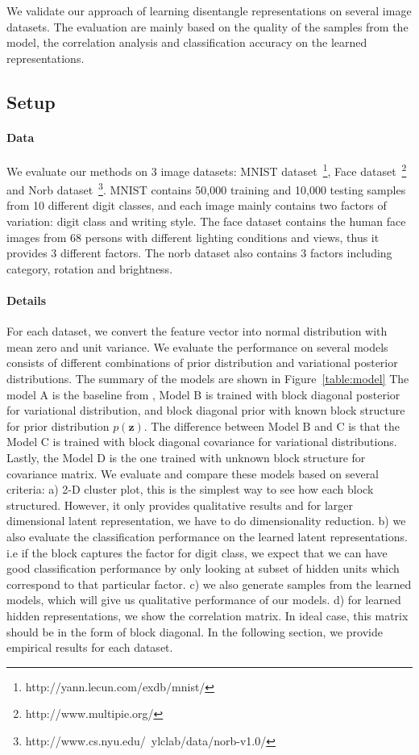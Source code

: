 We validate our approach of learning disentangle representations on several image datasets. The evaluation are mainly based on the quality of the samples from the model, the correlation analysis and classification accuracy on the learned representations. 

\subsection{Setup}
\paragraph{Data} We evaluate our methods on 3 image datasets: MNIST dataset~\footnote{http://yann.lecun.com/exdb/mnist/}, Face dataset~\footnote{http://www.multipie.org/} and Norb dataset~\footnote{http://www.cs.nyu.edu/~ylclab/data/norb-v1.0/}. MNIST contains 50,000 training and 10,000 testing samples from 10 different digit classes, and each image mainly contains two factors of variation: digit class and writing style. The face dataset contains the human face images from 68 persons with different lighting conditions and views, thus it provides 3 different factors. The norb dataset also contains 3 factors including category, rotation and brightness. 

\paragraph{Details} For each dataset, we convert the feature vector into normal distribution with mean zero and unit variance. We evaluate the performance on several models consists of different combinations of prior distribution and variational posterior distributions. The summary of the models are shown in Figure~\ref{table:model} The model A is the baseline from \cite{kingma2013auto}, Model B is trained with block diagonal posterior for variational distribution, and block diagonal prior with known block structure for prior distribution $p(\mathbf{z})$. The difference between Model B and C is that the Model C is trained with block diagonal covariance for variational distributions. Lastly, the Model D is the one trained with unknown block structure for covariance matrix. We evaluate and compare these models based on several criteria: a) 2-D cluster plot, this is the simplest way to see how each block structured. However, it only provides qualitative results and for larger dimensional latent representation, we have to do dimensionality reduction. b) we also evaluate the classification performance on the learned latent representations. i.e if the block captures the factor for digit class, we expect that we can have good classification performance by only looking at subset of hidden units which correspond to that particular factor. c) we also generate samples from the learned models, which will give us qualitative performance of our models. d) for learned hidden representations, we show the correlation matrix. In ideal case, this matrix should be in the form of block diagonal. In the following section, we provide empirical results for each dataset. 

